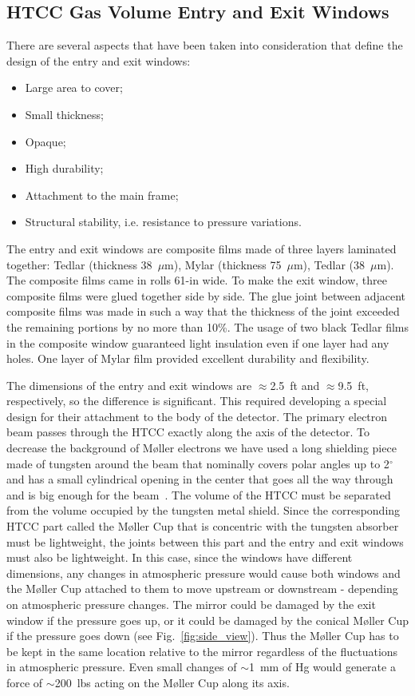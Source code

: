 \subsection{HTCC Gas Volume Entry and Exit Windows}

There are several aspects that have been taken into consideration that define the design of the entry and
exit windows:

\begin{itemize}
    \item Large area to cover;
    \item Small thickness;
    \item Opaque;
    \item High durability;
    \item Attachment to the main frame;
    \item Structural stability, i.e. resistance to pressure variations.
    \end{itemize}

The entry and exit windows are composite films made of three layers laminated together: Tedlar (thickness
38~$\mu$m), Mylar (thickness 75~$\mu$m), Tedlar (38~$\mu$m). The composite films came in rolls 61-in
wide. To make the exit window, three composite films were glued together side by side. The glue joint between
adjacent composite films was made in such a way that the thickness of the joint exceeded the remaining portions
by no more than 10\%. The usage of two black Tedlar films in the composite window guaranteed light insulation
even if one layer had any holes. One layer of Mylar film provided excellent durability and flexibility.

The dimensions of the entry and exit windows are $\approx$2.5~ft and $\approx$9.5~ft, respectively, so the
difference is significant. This required developing a special design for their attachment to the body of the
detector. The primary electron beam passes through the HTCC exactly along the axis of the detector. To
decrease the background of M{\o}ller electrons we have used a long shielding piece made of tungsten around
the beam that nominally covers polar angles up to 2$^\circ$ and has a small cylindrical opening in the center that
goes all the way through and is big enough for the beam~\cite{beamline-nim}. The volume of the HTCC must be
separated from the volume occupied by the tungsten metal shield. Since the corresponding HTCC part called the
M{\o}ller Cup that is concentric with the tungsten absorber must be lightweight, the joints between this part
and the entry and exit windows must also be lightweight. In this case, since the windows have different
dimensions, any changes in atmospheric pressure would cause both windows and the M{\o}ller Cup attached to
them to move upstream or downstream - depending on atmospheric pressure changes. The mirror could be
damaged by the exit window if the pressure goes up, or it could be damaged by the conical M{\o}ller Cup if the
pressure goes down (see Fig.~\ref{fig:side_view}). Thus the M{\o}ller Cup has to be kept in the same location
relative to the mirror regardless of the fluctuations in atmospheric pressure. Even small changes of
$\sim$1~mm of Hg would generate a force of $\sim$200~lbs acting on the M{\o}ller Cup along its axis.  

